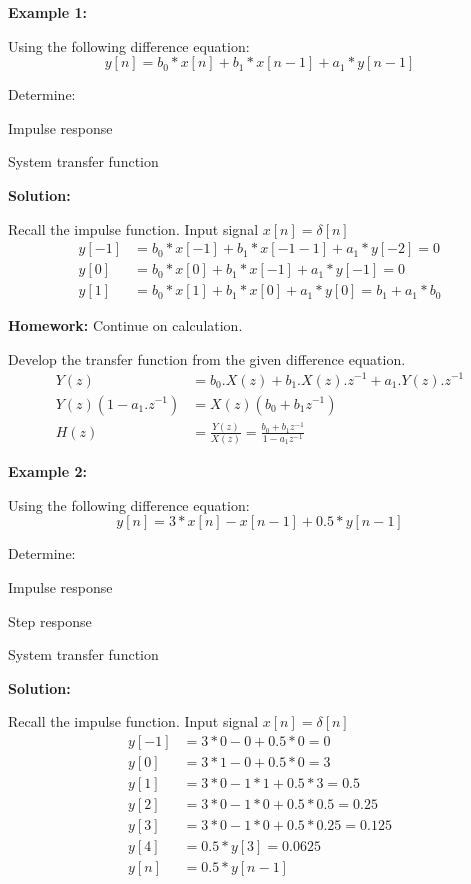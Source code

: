 \textbf{Example 1:}

Using the following difference equation:
$$ y[n] = b_0*x[n] + b_1*x[n-1] + a_1*y[n-1] $$

Determine:

\item Impulse response
\item System transfer function


\textbf{Solution:}


\item Recall the impulse function. Input signal $x[n] = \delta[n]$
\begin{align*}
	y[-1] &= b_0*x[-1] + b_1*x[-1-1] + a_1*y[-2] = 0 \\
	y[0] &= b_0*x[0] + b_1*x[-1] + a_1*y[-1] = 0 \\
	y[1] &= b_0*x[1] + b_1*x[0] + a_1*y[0] = b_1 + a_1*b_0
\end{align*}


\textbf{Homework:} Continue on calculation.

\item Develop the transfer function from the given difference equation.
\begin{align*}
	Y(z) &= b_0.X(z) + b_1.X(z).z^{-1} + a_1.Y(z).z^{-1} \\
	Y(z)(1-a_1.z^{-1}) &= X(z)(b_0 + b_1z^{-1}) \\
	H(z) &= \frac{Y(z)}{X(z)} = \frac{b_0+b_1z^{-1}}{1-a_1z^{-1}}
\end{align*}


\textbf{Example 2:}

Using the following difference equation:
$$ y[n] = 3*x[n] - x[n-1] + 0.5*y[n-1] $$

Determine:

\item Impulse response
\item Step response
\item System transfer function


\textbf{Solution:}

\item Recall the impulse function. Input signal $x[n] = \delta[n]$
\begin{align*}
y[-1] &= 3*0 - 0 + 0.5*0 = 0 \\
	y[0] &= 3*1 - 0 + 0.5*0 = 3 \\
	y[1] &= 3*0 - 1*1 + 0.5*3 = 0.5 \\
	y[2] &= 3*0 - 1*0 + 0.5*0.5 = 0.25 \\
	y[3] &= 3*0 - 1*0 + 0.5*0.25 = 0.125 \\
	y[4] &= 0.5*y[3] = 0.0625 \\
	y[n] &= 0.5*y[n-1]
\end{align*}


